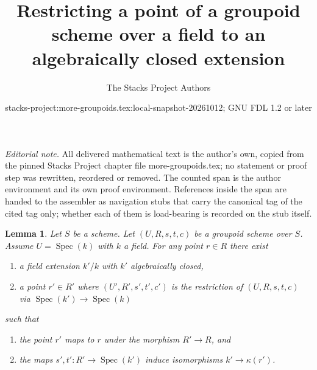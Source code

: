\documentclass{stacks-project}
\title{Restricting a point of a groupoid scheme over a field to an algebraically closed extension}
\author{The Stacks Project Authors}
\date{stacks-project:more-groupoids.tex:local-snapshot-20261012; GNU FDL 1.2 or later}
\theoremstyle{plain}
\newtheorem{lemma}[subsection]{Lemma}
\theoremstyle{definition}
\theoremstyle{remark}
\numberwithin{equation}{subsection}
\def\Spec{\mathop{\mathrm{Spec}}}
\begin{document}
\maketitle
\setcounter{subsection}{1}
\noindent\textit{Editorial note.} All delivered mathematical text is the author's own, copied from the pinned Stacks Project chapter file more-groupoids.tex; no statement or proof step was rewritten, reordered or removed. The counted span is the author environment and its own proof environment. References inside the span are handed to the assembler as navigation stubs that carry the canonical tag of the cited tag only; whether each of them is load-bearing is recorded on the stub itself.\par\medskip
\begin{lemma}
\label{lemma-groupoid-on-field-explain-points}
Let $S$ be a scheme. Let $(U, R, s, t, c)$ be a groupoid scheme
over $S$. Assume $U = \Spec(k)$ with $k$ a field.
For any point $r \in R$ there exist
\begin{enumerate}
\item a field extension $k'/k$ with $k'$ algebraically closed,
\item a point $r' \in R'$ where $(U', R', s', t', c')$ is the
restriction of $(U, R, s, t, c)$ via $\Spec(k') \to \Spec(k)$
\end{enumerate}
such that
\begin{enumerate}
\item the point $r'$ maps to $r$ under the morphism $R' \to R$, and
\item the maps $s', t' : R' \to \Spec(k')$ induce isomorphisms
$k' \to \kappa(r')$.
\end{enumerate}
\end{lemma}
\end{document}
